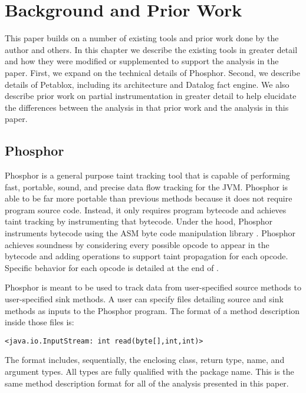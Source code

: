 \chapter{Background and Prior Work}
This paper builds on a number of existing tools and prior work done by the author and others. In this chapter we describe the existing tools in greater detail and how they were modified or supplemented to support the analysis in the paper. First, we expand on the technical details of Phosphor. Second, we describe details of Petablox, including its architecture and Datalog fact engine. We also describe prior work on partial instrumentation in greater detail to help elucidate the differences between the analysis in that prior work and the analysis in this paper.
\section{Phosphor}
Phosphor \cite{phosphor_oopsla} is a general purpose taint tracking tool that is capable of performing fast, portable, sound, and precise data flow tracking for the JVM. Phosphor is able to be far more portable than previous methods because it does not require program source code. Instead, it only requires program bytecode and achieves taint tracking by instrumenting that bytecode. Under the hood, Phosphor instruments bytecode using the ASM byte code manipulation library \cite{bruneton2002asm}. Phosphor achieves soundness by considering every possible opcode to appear in the bytecode and adding operations to support taint propagation for each opcode. Specific behavior for each opcode is detailed at the end of \cite{phosphor_oopsla}.

Phosphor is meant to be used to track data from user-specified source methods to user-specified sink methods. A user can specify files detailing source and sink methods as inputs to the Phosphor program. The format of a method description inside those files is:

\begin{center}
  \texttt{<java.io.InputStream: int read(byte[],int,int)>}
\end{center}

The format includes, sequentially, the enclosing class, return type, name, and argument types. All types are fully qualified with the package name. This is the same method description format for all of the analysis presented in this paper.

